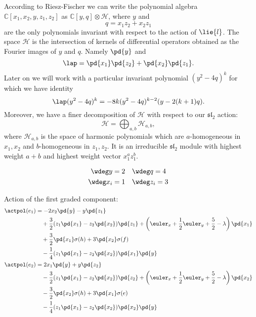 \begin{appendices}
According to Riesz-Fischer \cite{RF_1920} we can write the polynomial algebra $\mathbb{C}[x_1,x_2,y,z_1,z_2]$ as $\mathbb{C}[y,q] \otimes \mathcal{H}$, where $y$ and \[q = x_1z_2 + x_2 z_1\] are the only polynomials invariant with respect to the action of $\lie{l}$. The space $\mathcal{H}$ is the intersection of kernels of differential operators obtained as the Fourier images of $y$ and $q$. Namely $\pd{y}$ and
\[\lap = \pd{x_1}\pd{z_2} + \pd{x_2}\pd{z_1}.\]
Later on we will work with a particular invariant polynomial $(y^2 - 4q)^k$ for which we have identity
\[
\lap (y^2 - 4q)^k = -8k(y^2 - 4q)^{k-2}(y - 2(k+1)q).
\]
Moreover, we have a finer decomposition of $\mathcal{H}$ with respect to our $\mathfrak{sl}_2$ action:
\begin{equation}
    \mathcal{H} = \bigoplus_{a,b} \mathcal{H}_{a,b},
\end{equation}
where $\mathcal{H}_{a,b}$ is the space of harmonic polynomials which are $a$-homogeneous in $x_1, x_2$ and $b$-homogeneous in $z_1, z_2$. It is an irreducible $\mathfrak{sl}_2$ module with highest weight $a+b$ and highest weight vector $x_1^a z_1^b$. %

\begin{align}
    \wdeg y = 2 & \quad  \wdeg q = 4 \\
    \wdeg x_i = 1 & \quad  \wdeg z_i = 3
\end{align}

Action of the first graded component:
\begin{align}
    \actpol(e_1) &= -2 x_2 \pd{y} - y \pd{z_1} \\
             & \quad + \frac{3}{2} (z_1 \pd{x_1} - z_2 \pd{x_2}) \pd{z_1} + \left(\euler_x + \frac{1}{2}\euler_y + \frac{5}{2} - \lambda\right)\pd{x_1} \\
             & \quad + \frac{3}{2} \pd{x_1}\sigma(h) + 3 \pd{x_2} \sigma(f) \\
             & \quad - \frac{1}{4} (z_1 \pd{x_1} - z_2\pd{x_2})\pd{x_1}\pd{y}\\
    \actpol(e_2) &= 2 x_1 \pd{y} + y \pd{z_2} \\
             & \quad - \frac{3}{2} (z_1 \pd{x_1} - z_2 \pd{x_2}) \pd{z_2} + \left(\euler_x + \frac{1}{2}\euler_y + \frac{5}{2} - \lambda\right)\pd{x_2} \\
             & \quad - \frac{3}{2} \pd{x_2} \sigma(h) + 3 \pd{x_1} \sigma(e) \\
             & \quad - \frac{1}{4} (z_1 \pd{x_1} - z_2 \pd{x_2})\pd{x_2}\pd{y}
\end{align}


\end{appendices}
